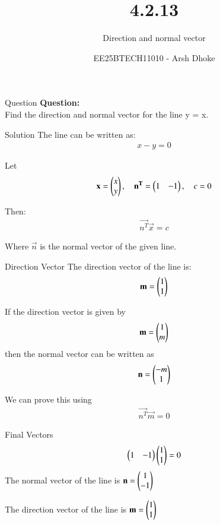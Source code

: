 \documentclass{beamer}
\title{4.2.13}
\subtitle{Direction and normal vector}
\author{EE25BTECH11010 - Arsh Dhoke}
\date{}
\begin{document}
\begin{frame}
  \titlepage
\end{frame}


\begin{frame}{Question}
\textbf{Question:}\\
 Find the direction and normal vector for the line y = x.
\end{frame}

\begin{frame}{Solution}
The line can be written as: 
\begin{align}
x - y = 0
\end{align}

Let
\begin{align}
\mathbf{x} = \begin{pmatrix}x \\ y\end{pmatrix}, \quad
\mathbf{n^T} = \begin{pmatrix}1 & -1\end{pmatrix}, \quad
c = 0
\end{align}

Then:
\begin{align}
\vec{n^T} \vec{x} = c
\end{align}

Where \(\vec{n}\) is the normal vector of the given line.
\end{frame}

\begin{frame}{Direction Vector}
The direction vector of the line is:
\begin{align}
\mathbf{m} = \begin{pmatrix}1 \\ 1\end{pmatrix}
\end{align}

If the direction vector is given by
\begin{align}
\mathbf{m} = \begin{pmatrix}1 \\ m\end{pmatrix}
\end{align}
then the normal vector can be written as
\begin{align}
\mathbf{n} = \begin{pmatrix}-m \\ 1\end{pmatrix}
\end{align}

We can prove this using
\begin{align}
\vec{n^T}\vec{m} = 0
\end{align}


\end{frame}

\begin{frame}{Final Vectors}
\begin{align}
\begin{pmatrix}1 & -1\end{pmatrix}\begin{pmatrix}1 \\ 1\end{pmatrix} = 0
\end{align}
The normal vector of the line is 
$
\mathbf{n} = \begin{pmatrix}1 \\ -1\end{pmatrix}
$

The direction vector of the line is 
$
\mathbf{m} = \begin{pmatrix}1 \\ 1\end{pmatrix}
$
\end{frame}
\end{document}
